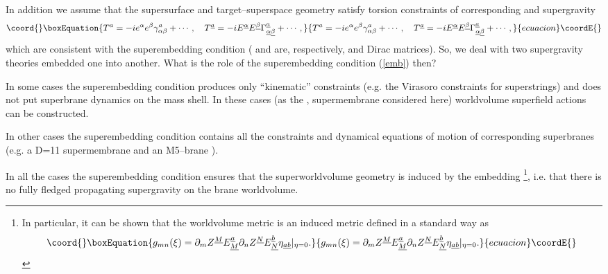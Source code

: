 \documentclass[a4paper,12pt]{article}
\begin{document}
In addition we assume that the supersurface and
target--superspace geometry satisfy torsion constraints of
corresponding \coordHE{} and \coordHE{} supergravity
\begin{equation}\coord{}\boxEquation{\label{torsion}
T^a=-ie^\alpha e^\beta \gamma_{\alpha\beta}^a +
\cdots, \quad T^{\underline a}=
-iE^{\underline\alpha} E^{\underline\beta}
\Gamma_{\underline\alpha\underline\beta}^{\underline a} +
\cdots,
}{T^a=-ie^\alpha e^\beta \gamma_{\alpha\beta}^a +
\cdots, \quad T^{\underline a}=
-iE^{\underline\alpha} E^{\underline\beta}
\Gamma_{\underline\alpha\underline\beta}^{\underline a} +
\cdots,
}{ecuacion}\coordE{}\end{equation}
which are consistent with the superembedding condition
(\coordHE{} and \coordHE{} are, respectively, \coordHE{}
and \coordHE{} Dirac matrices). So, we deal with two supergravity
theories embedded one into another. What is the role of the
superembedding condition (\ref{emb}) then?

In some cases the superembedding condition produces only
``kinematic'' constraints (e.g. the Virasoro constraints for
superstrings) and does not put superbrane dynamics on the mass
shell. In these cases (as the \coordHE{}, \coordHE{} supermembrane
considered here) worldvolume superfield actions can be
constructed.

In other cases the superembedding condition contains all the
constraints and dynamical equations of motion of corresponding
superbranes (e.g. a D=11 supermembrane \cite{bpstv} and an
M5--brane \cite{hs}).

In all the cases the superembedding condition ensures that the
superworldvolume geometry is induced by the embedding
\footnote{In particular, it can be shown that the worldvolume
metric is an induced metric defined in a standard way as
\begin{equation}\coord{}\boxEquation{\label{indmet}
g_{mn}(\xi)=\partial_mZ^{\underline M}E_{\underline M}^{\underline
a}\partial_nZ^{\underline N} E_{\underline N}^{\underline
b}\eta_{\underline{ab}}|_{\eta=0}.
}{g_{mn}(\xi)=\partial_mZ^{\underline M}E_{\underline M}^{\underline
a}\partial_nZ^{\underline N} E_{\underline N}^{\underline
b}\eta_{\underline{ab}}|_{\eta=0}.
}{ecuacion}\coordE{}\end{equation}},
i.e. that there is no fully fledged propagating supergravity on
the brane worldvolume.
\end{document}

